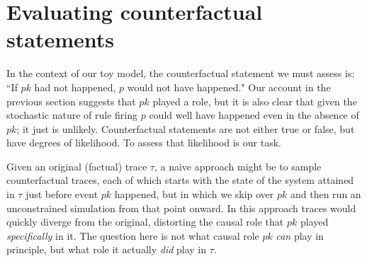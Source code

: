 
\newcommand{\PCFST}[0]{\ProbParen{\CFST{}}}

\newcommand{\ItAbduction}[0]{(\textit{abduction})}
\newcommand{\ItAction}[0]{(\textit{action})}
\newcommand{\ItPrediction}[0]{(\textit{prediction})}


\section{Evaluating counterfactual
  statements}\label{sec:counterfactual}


In the context of our toy model, the counterfactual statement we must
assess is: ``If $pk$ had not happened, $p$ would not have happened."
Our account in the previous section suggests that $pk$ played a role,
but it is also clear that given the stochastic nature of rule firing
$p$ could well have happened even in the absence of $pk$; it just is
unlikely. Counterfactual statements are not either true or false, but
have degrees of likelihood. To assess that likelihood is our task.

Given an original (factual) trace $\tau$, a naive approach might be
to sample counterfactual traces, each of which starts with the
state of the system attained in $\tau$ just before event $pk$
happened, but in which we skip over $pk$ and then run an unconstrained
simulation from that point onward. In this approach traces would
quickly diverge from the original, distorting the causal role that
$pk$ played \emph{specifically} in it. The question here is not what
causal role $pk$ \emph{can} play in principle, but what role it
actually \emph{did} play in $\tau$.


